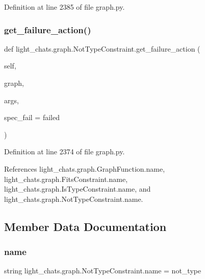 Definition at line 2385 of file graph.\+py.

\mbox{\label{classlight__chats_1_1graph_1_1NotTypeConstraint_a006f37da6afe1dd06db790a6d19b07db}} 
\subsubsection{\texorpdfstring{get\+\_\+failure\+\_\+action()}{get\_failure\_action()}}
{\footnotesize\ttfamily def light\+\_\+chats.\+graph.\+Not\+Type\+Constraint.\+get\+\_\+failure\+\_\+action (\begin{DoxyParamCaption}\item[{}]{self,  }\item[{}]{graph,  }\item[{}]{args,  }\item[{}]{spec\+\_\+fail = {\ttfamily \textquotesingle{}failed\textquotesingle{}} }\end{DoxyParamCaption})}



Definition at line 2374 of file graph.\+py.



References light\+\_\+chats.\+graph.\+Graph\+Function.\+name, light\+\_\+chats.\+graph.\+Fits\+Constraint.\+name, light\+\_\+chats.\+graph.\+Is\+Type\+Constraint.\+name, and light\+\_\+chats.\+graph.\+Not\+Type\+Constraint.\+name.



\subsection{Member Data Documentation}
\mbox{\label{classlight__chats_1_1graph_1_1NotTypeConstraint_afae4920597f8ab3937d3f172fceba01a}} 
\subsubsection{\texorpdfstring{name}{name}}
{\footnotesize\ttfamily string light\+\_\+chats.\+graph.\+Not\+Type\+Constraint.\+name = \textquotesingle{}not\+\_\+type\textquotesingle{}\hspace{0.3cm}{\ttfamily [static]}}



